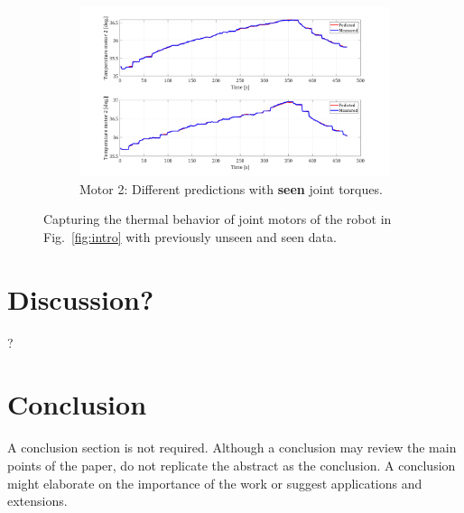 \documentclass{ifacconf}
\begin{document}
\begin{figure}[t!]
\begin{subfigure}[t]{\columnwidth}
	\includegraphics[height=2.in]{./pictures/applications/J2.png}
	\caption{Motor 2: Different predictions with \textbf{seen} joint torques.}
\end{subfigure}
	\caption{Capturing the thermal behavior of joint motors of the robot in Fig.~\ref{fig:intro} with previously unseen and seen data.}
\end{figure}

\section{Discussion?}
?
\section{Conclusion}

A conclusion section is not required. Although a conclusion may review
the main points of the paper, do not replicate the abstract as the
conclusion. A conclusion might elaborate on the importance of the work
or suggest applications and extensions.


                                                   


\end{document}
